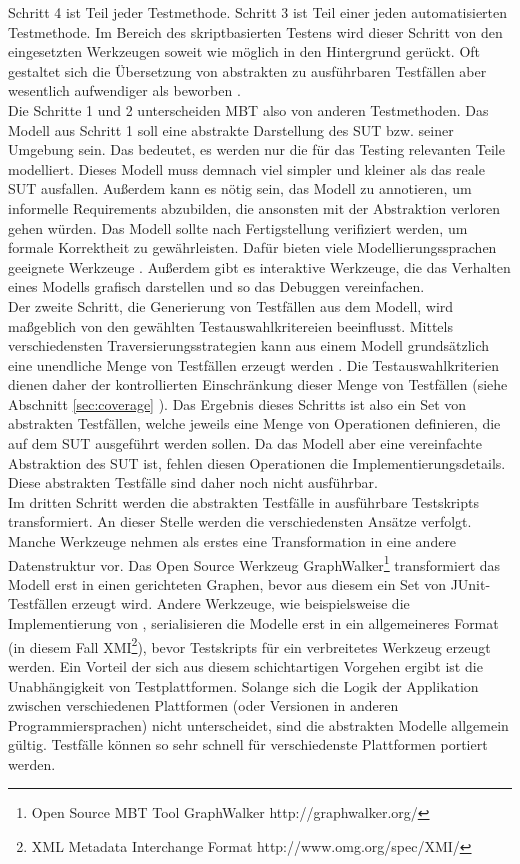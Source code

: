 Schritt 4 ist Teil jeder Testmethode. Schritt 3 ist Teil einer jeden automatisierten Testmethode. Im Bereich des skriptbasierten Testens wird dieser Schritt von den eingesetzten Werkzeugen soweit wie möglich in den Hintergrund gerückt. Oft gestaltet sich die Übersetzung von abstrakten zu ausführbaren Testfällen aber wesentlich aufwendiger als beworben \cite{graham_experiences_2012}.\\
Die Schritte 1 und 2 unterscheiden \Gls{MBT} also von anderen Testmethoden. Das Modell aus Schritt 1 soll eine abstrakte Darstellung des \Gls{SUT} bzw. seiner Umgebung sein. Das bedeutet, es werden nur die für das Testing relevanten Teile modelliert. Dieses Modell muss demnach viel simpler und kleiner als das reale \Gls{SUT} ausfallen. Außerdem kann es nötig sein, das Modell zu annotieren, um informelle Requirements abzubilden, die ansonsten mit der Abstraktion verloren gehen würden. Das Modell sollte nach Fertigstellung verifiziert werden, um formale Korrektheit zu gewährleisten. Dafür bieten viele Modellierungssprachen geeignete Werkzeuge \cite{kaneiwa_consistency_2006}. Außerdem gibt es interaktive Werkzeuge, die das Verhalten eines Modells grafisch darstellen und so das Debuggen vereinfachen.\\
Der zweite Schritt, die Generierung von Testfällen aus dem Modell, wird maßgeblich von den gewählten Testauswahlkritereien beeinflusst. Mittels verschiedensten Traversierungsstrategien kann aus einem Modell grundsätzlich eine unendliche Menge von Testfällen erzeugt werden \cite{utting_practical_2007}. Die Testauswahlkriterien dienen daher der kontrollierten Einschränkung dieser Menge von Testfällen (siehe Abschnitt \ref{sec:coverage} ). Das Ergebnis dieses Schritts ist also ein Set von abstrakten Testfällen, welche jeweils eine Menge von Operationen definieren, die auf dem \Gls{SUT} ausgeführt werden sollen. Da das Modell aber eine vereinfachte Abstraktion des \Gls{SUT} ist, fehlen diesen Operationen die Implementierungsdetails. Diese abstrakten Testfälle sind daher noch nicht ausführbar.\\
Im dritten Schritt werden die abstrakten Testfälle in ausführbare Testskripts transformiert. An dieser Stelle werden die verschiedensten Ansätze verfolgt. Manche Werkzeuge nehmen als erstes eine Transformation in eine andere Datenstruktur vor. Das Open Source Werkzeug GraphWalker\footnote{Open Source \Gls{MBT} Tool GraphWalker http://graphwalker.org/} transformiert das Modell erst in einen gerichteten Graphen, bevor aus diesem ein Set von JUnit-Testfällen erzeugt wird. Andere Werkzeuge, wie beispielsweise die Implementierung von \citeauthor{pinheiro_model-based_2013} \cite{pinheiro_model-based_2013}, serialisieren die Modelle erst in ein allgemeineres Format (in diesem Fall XMI\footnote{XML Metadata Interchange Format http://www.omg.org/spec/XMI/}), bevor Testskripts für ein verbreitetes Werkzeug erzeugt werden. Ein Vorteil der sich aus diesem schichtartigen Vorgehen ergibt ist die Unabhängigkeit von Testplattformen. Solange sich die Logik der Applikation zwischen verschiedenen Plattformen (oder Versionen in anderen Programmiersprachen) nicht unterscheidet, sind die abstrakten Modelle allgemein gültig. Testfälle können so sehr schnell für verschiedenste Plattformen portiert werden.\\
